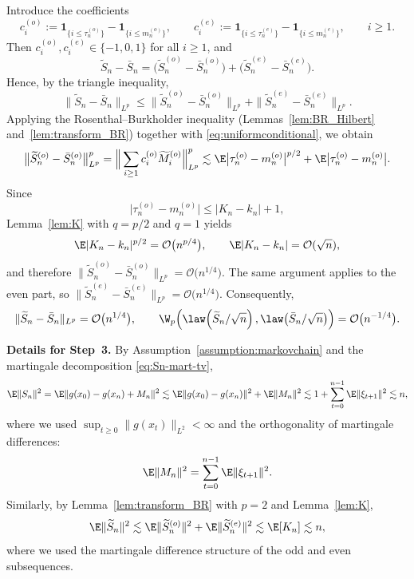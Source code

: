 \documentclass[mnsc,nonblindrev]{informs3}
\begin{document}
Introduce the coefficients
\[
c_i^{(o)} := \mathbf{1}_{\{i \le \tau_n^{(o)}\}} - \mathbf{1}_{\{i \le m_n^{(o)}\}},
\qquad
c_i^{(e)} := \mathbf{1}_{\{i \le \tau_n^{(e)}\}} - \mathbf{1}_{\{i \le m_n^{(e)}\}},
\qquad i \ge 1.
\]
Then \(c_i^{(o)}, c_i^{(e)} \in \{-1,0,1\}\) for all \(i \ge 1\), and
\[
\widetilde S_n - \bar S_n
=
\bigl(\widetilde S_n^{(o)} - \bar S_n^{(o)}\bigr)
+
\bigl(\widetilde S_n^{(e)} - \bar S_n^{(e)}\bigr).
\]
Hence, by the triangle inequality,
\[
\|\widetilde S_n - \bar S_n\|_{L^p}
\le
\|\widetilde S_n^{(o)} - \bar S_n^{(o)}\|_{L^p}
+
\|\widetilde S_n^{(e)} - \bar S_n^{(e)}\|_{L^p}.
\]
Applying the Rosenthal--Burkholder inequality
(Lemmas~\ref{lem:BR_Hilbert} and~\ref{lem:transform_BR}) together with
\eqref{eq:uniformconditional}, we obtain
\[
\bigl\|\widetilde S_n^{(o)} - \bar S_n^{(o)}\bigr\|_{L^p}^p
=
\Big\|\sum_{i\ge1} c_i^{(o)} \widetilde M_i^{(o)}\Big\|_{L^p}^p
\lesssim
\E\bigl| \tau_n^{(o)} - m_n^{(o)} \bigr|^{p/2}
+
\E\bigl| \tau_n^{(o)} - m_n^{(o)} \bigr|.
\]
Since
\[
\bigl| \tau_n^{(o)} - m_n^{(o)} \bigr| \le |K_n-k_n|+1,
\]
Lemma~\ref{lem:K} with \(q=p/2\) and \(q=1\) yields
\[
\E|K_n-k_n|^{p/2} = \mathcal O\bigl(n^{p/4}\bigr),
\qquad
\E|K_n-k_n| = \mathcal O(\sqrt n),
\]
and therefore $\|\widetilde S_n^{(o)} - \bar S_n^{(o)}\|_{L^p}
= \mathcal O\bigl(n^{1/4}\bigr).$ The same argument applies to the even part, so $\|\widetilde S_n^{(e)} - \bar S_n^{(e)}\|_{L^p}
= \mathcal O\bigl(n^{1/4}\bigr).$ Consequently,
\[
\|\widetilde S_n - \bar S_n\|_{L^p}
= \mathcal O\bigl(n^{1/4}\bigr),
\qquad
\W_p\!\left(
\law\!\left(\widetilde S_n/\sqrt{n}\right),
\law\!\left(\bar S_n/\sqrt{n}\right)
\right)
= \mathcal O\bigl(n^{-1/4}\bigr).
\]

\medskip
\noindent\textbf{Details for Step~3.}
By Assumption~\ref{assumption:markovchain} and the martingale decomposition
\eqref{eq:Sn-mart-tv},
\begin{align*}
\E\|S_n\|^2
=
\E\|g(x_0)-g(x_n)+M_n\|^2
\lesssim \E\|g(x_0)-g(x_n)\|^2 + \E\|M_n\|^2 \lesssim 1 + \sum_{t=0}^{n-1}\E\|\xi_{t+1}\|^2 \lesssim n,
\end{align*}
where we used \(\sup_{t\ge0}\|g(x_t)\|_{L^2}<\infty\) and the orthogonality of
martingale differences:
\[
\E\|M_n\|^2 = \sum_{t=0}^{n-1}\E\|\xi_{t+1}\|^2.
\]
Similarly, by Lemma~\ref{lem:transform_BR} with \(p=2\) and
Lemma~\ref{lem:K},
\[
\E\|\widetilde S_n\|^2
\lesssim
\E\|\widetilde S_n^{(o)}\|^2 + \E\|\widetilde S_n^{(e)}\|^2
\lesssim
\E[K_n]
\lesssim n,
\]
where we used the martingale difference structure of the odd and even
subsequences.
\end{document}
